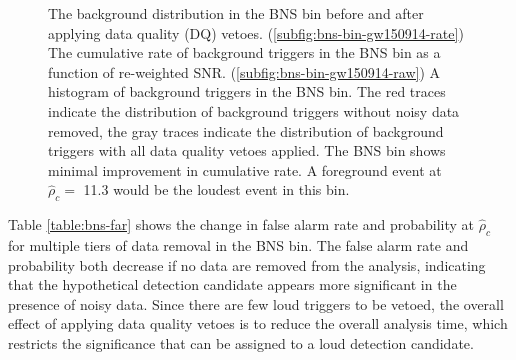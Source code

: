 \begin{figure}[!ht]%
\centering
  \caption[BNS bin histograms - GW150914 analysis]{The background distribution in the BNS bin before and after applying data quality (DQ) vetoes. %
           (\ref{subfig:bns-bin-gw150914-rate}) The cumulative rate of background triggers %
           in the BNS bin as a function of re-weighted SNR. %
           (\ref{subfig:bns-bin-gw150914-raw}) A histogram of background triggers %
           in the BNS bin. %
           The red traces indicate the %
           distribution of background triggers without noisy data removed, %
           the gray traces indicate the distribution of background triggers with %
           all data quality vetoes applied. The BNS bin shows %
           minimal improvement in cumulative rate. A foreground event %
           at $\hat{\rho}_{c} =$ 11.3 would be the loudest event in this bin.}
  \label{fig:bns-bin-far_GW150914}
\end{figure}

Table \ref{table:bns-far} shows the change in false alarm rate and probability at
$\hat{\rho}_c$ for multiple tiers
of data removal in the BNS bin. The false alarm rate and probability both decrease
if no data are removed from the analysis, indicating that the hypothetical detection candidate
appears more significant in the presence of noisy data. Since there are few loud triggers to be vetoed,
the overall effect of applying data quality vetoes is to reduce the overall analysis time, which
restricts the significance that can be assigned to a loud detection candidate.

